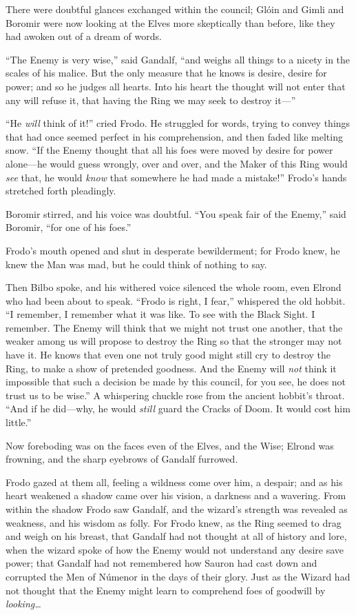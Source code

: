 There were doubtful glances exchanged within the council; Glóin and Gimli and Boromir were now looking at the Elves more skeptically than before, like they had awoken out of a dream of words.

“The Enemy is very wise,” said Gandalf, “and weighs all things to a nicety in the scales of his malice. But the only measure that he knows is desire, desire for power; and so he judges all hearts. Into his heart the thought will not enter that any will refuse it, that having the Ring we may seek to destroy it—”

“He \emph{will} think of it!” cried Frodo. He struggled for words, trying to convey things that had once seemed perfect in his comprehension, and then faded like melting snow. “If the Enemy thought that all his foes were moved by desire for power alone—he would guess wrongly, over and over, and the Maker of this Ring would \emph{see} that, he would \emph{know} that somewhere he had made a mistake!” Frodo’s hands stretched forth pleadingly.

Boromir stirred, and his voice was doubtful. “You speak fair of the Enemy,” said Boromir, “for one of his foes.”

Frodo’s mouth opened and shut in desperate bewilderment; for Frodo knew, he knew the Man was mad, but he could think of nothing to say.

Then Bilbo spoke, and his withered voice silenced the whole room, even Elrond who had been about to speak. “Frodo is right, I fear,” whispered the old hobbit. “I remember, I remember what it was like. To see with the Black Sight. I remember. The Enemy will think that we might not trust one another, that the weaker among us will propose to destroy the Ring so that the stronger may not have it. He knows that even one not truly good might still cry to destroy the Ring, to make a show of pretended goodness. And the Enemy will \emph{not} think it impossible that such a decision be made by this council, for you see, he does not trust us to be wise.” A whispering chuckle rose from the ancient hobbit’s throat. “And if he did—why, he would \emph{still} guard the Cracks of Doom. It would cost him little.”

Now foreboding was on the faces even of the Elves, and the Wise; Elrond was frowning, and the sharp eyebrows of Gandalf furrowed.

Frodo gazed at them all, feeling a wildness come over him, a despair; and as his heart weakened a shadow came over his vision, a darkness and a wavering. From within the shadow Frodo saw Gandalf, and the wizard’s strength was revealed as weakness, and his wisdom as folly. For Frodo knew, as the Ring seemed to drag and weigh on his breast, that Gandalf had not thought at all of history and lore, when the wizard spoke of how the Enemy would not understand any desire save power; that Gandalf had not remembered how Sauron had cast down and corrupted the Men of Númenor in the days of their glory. Just as the Wizard had not thought that the Enemy might learn to comprehend foes of goodwill by \emph{looking…}

